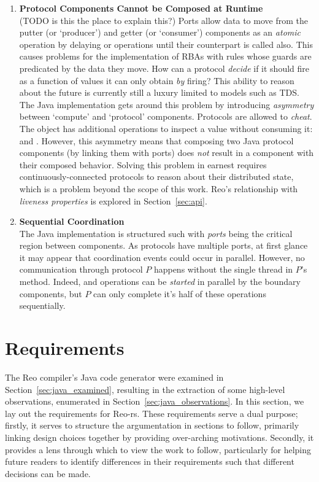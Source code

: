 \begin{enumerate}
	\item \textbf{Protocol Components Cannot be Composed at Runtime}\\
	(TODO is this the place to explain this?)
	Ports allow data to move from the putter (or `producer') and getter (or `consumer') components as an \textit{atomic} operation by delaying  or  operations until their counterpart is called also. This causes problems for the implementation of RBAs with rules whose guards are predicated by the data they move. How can a protocol \textit{decide} if it should fire as a function of values it can only obtain \textit{by} firing? This ability to reason about the future is currently still a luxury limited to models such as TDS. The Java implementation gets around this problem by introducing \textit{asymmetry} between `compute' and `protocol' components. Protocols are allowed to \textit{cheat}. The  object has additional operations to inspect a value without consuming it:  and . However, this asymmetry means that composing two Java protocol components (by linking them with ports) does \textit{not} result in a component with their composed behavior. Solving this problem in earnest requires continuously-connected protocols to reason about their distributed state, which is a problem beyond the scope of this work. Reo's relationship with \textit{liveness properties} is explored in Section~\ref{sec:api}.
	
	\item \textbf{Sequential Coordination}\\
	The Java implementation is structured such with \textit{ports} being the critical region between components. As protocols have multiple ports, at first glance it may appear that coordination events could occur in parallel. However, no communication through protocol $P$ happens without the single thread in $P$'s  method. Indeed,  and  operations can be \textit{started} in parallel by the boundary components, but $P$ can only complete it's half of these operations sequentially.
	
\end{enumerate}

\section{Requirements}
The Reo compiler's Java code generator were examined in Section~\ref{sec:java_examined}, resulting in the extraction of some high-level observations, enumerated in Section~\ref{sec:java_observations}. In this section, we lay out the requirements for Reo-rs. These requirements serve a dual purpose; firstly, it serves to structure the argumentation in sections to follow, primarily linking design choices together by providing over-arching motivations. Secondly, it provides a lens through which to view the work to follow, particularly for helping future readers to identify differences in their requirements such that different decisions can be made.

